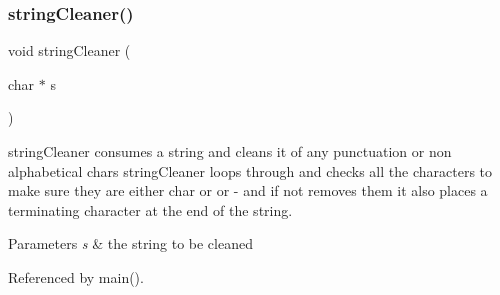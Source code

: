 \subsubsection{string\+Cleaner()}
{\footnotesize\ttfamily void string\+Cleaner (\begin{DoxyParamCaption}\item[{char $\ast$}]{s }\end{DoxyParamCaption})}

string\+Cleaner consumes a string and cleans it of any punctuation or non alphabetical chars string\+Cleaner loops through and checks all the characters to make sure they are either char or \textquotesingle{} or -\/ and if not removes them it also places a terminating character at the end of the string. 
\begin{DoxyParams}{Parameters}
{\em s} & the string to be cleaned \\
\hline
\end{DoxyParams}


Referenced by main().

